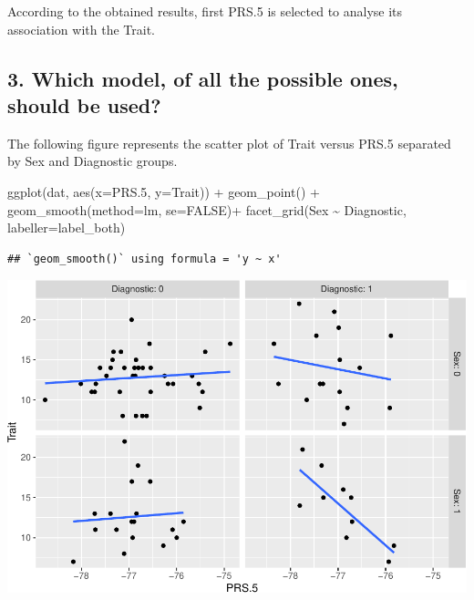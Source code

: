 \documentclass[
]{article}
\newenvironment{Shaded}{\begin{snugshade}}{\end{snugshade}}
\newcommand{\AttributeTok}[1]{\textcolor[rgb]{0.77,0.63,0.00}{#1}}
\newcommand{\ConstantTok}[1]{\textcolor[rgb]{0.00,0.00,0.00}{#1}}
\newcommand{\FloatTok}[1]{\textcolor[rgb]{0.00,0.00,0.81}{#1}}
\newcommand{\FunctionTok}[1]{\textcolor[rgb]{0.00,0.00,0.00}{#1}}
\newcommand{\NormalTok}[1]{#1}
\newcommand{\SpecialCharTok}[1]{\textcolor[rgb]{0.00,0.00,0.00}{#1}}
\begin{document}
According to the obtained results, first PRS.5 is selected to analyse
its association with the Trait.

\hypertarget{which-model-of-all-the-possible-ones-should-be-used}{%
\subsection{3. Which model, of all the possible ones, should be
used?}\label{which-model-of-all-the-possible-ones-should-be-used}}

The following figure represents the scatter plot of Trait versus PRS.5
separated by Sex and Diagnostic groups.

\begin{Shaded}
\begin{Highlighting}[]
\FunctionTok{ggplot}\NormalTok{(dat, }\FunctionTok{aes}\NormalTok{(}\AttributeTok{x=}\NormalTok{PRS}\FloatTok{.5}\NormalTok{, }\AttributeTok{y=}\NormalTok{Trait)) }\SpecialCharTok{+}
  \FunctionTok{geom\_point}\NormalTok{() }\SpecialCharTok{+}
  \FunctionTok{geom\_smooth}\NormalTok{(}\AttributeTok{method=}\NormalTok{lm, }\AttributeTok{se=}\ConstantTok{FALSE}\NormalTok{)}\SpecialCharTok{+}
  \FunctionTok{facet\_grid}\NormalTok{(Sex }\SpecialCharTok{\textasciitilde{}}\NormalTok{ Diagnostic, }\AttributeTok{labeller=}\NormalTok{label\_both)}
\end{Highlighting}
\end{Shaded}

\begin{verbatim}
## `geom_smooth()` using formula = 'y ~ x'
\end{verbatim}

\includegraphics{WorkingExample2_code_files/figure-latex/unnamed-chunk-6-1.pdf}
\end{document}

